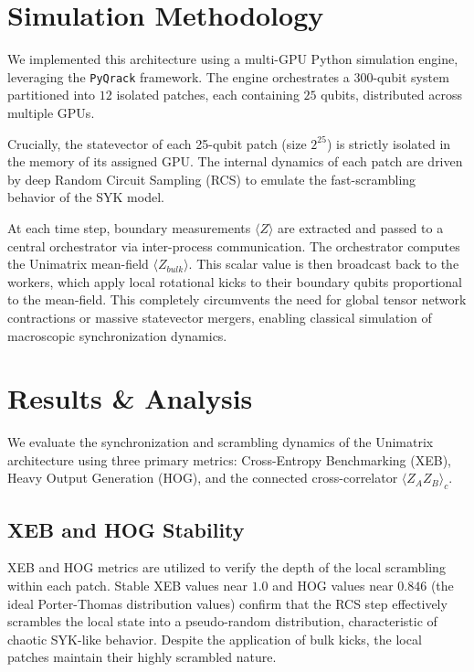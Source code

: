 \documentclass[11pt,a4paper]{article}
\begin{document}
\section{Simulation Methodology}
We implemented this architecture using a multi-GPU Python simulation engine, leveraging the \texttt{PyQrack} framework. The engine orchestrates a 300-qubit system partitioned into $12$ isolated patches, each containing $25$ qubits, distributed across multiple GPUs.

Crucially, the statevector of each 25-qubit patch (size $2^{25}$) is strictly isolated in the memory of its assigned GPU. The internal dynamics of each patch are driven by deep Random Circuit Sampling (RCS) to emulate the fast-scrambling behavior of the SYK model.

At each time step, boundary measurements $\langle Z \rangle$ are extracted and passed to a central orchestrator via inter-process communication. The orchestrator computes the Unimatrix mean-field $\langle Z_{bulk} \rangle$. This scalar value is then broadcast back to the workers, which apply local rotational kicks to their boundary qubits proportional to the mean-field. This completely circumvents the need for global tensor network contractions or massive statevector mergers, enabling classical simulation of macroscopic synchronization dynamics.

\section{Results \& Analysis}
We evaluate the synchronization and scrambling dynamics of the Unimatrix architecture using three primary metrics: Cross-Entropy Benchmarking (XEB), Heavy Output Generation (HOG), and the connected cross-correlator $\langle Z_A Z_B \rangle_c$.

\subsection{XEB and HOG Stability}
XEB and HOG metrics are utilized to verify the depth of the local scrambling within each patch. Stable XEB values near $1.0$ and HOG values near $0.846$ (the ideal Porter-Thomas distribution values) confirm that the RCS step effectively scrambles the local state into a pseudo-random distribution, characteristic of chaotic SYK-like behavior. Despite the application of bulk kicks, the local patches maintain their highly scrambled nature.
\end{document}
